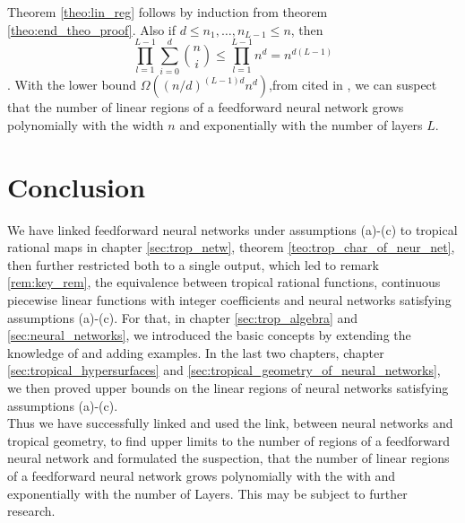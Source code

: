 \documentclass{article}
\theoremstyle{definition}
\begin{document}
Theorem \ref{theo:lin_reg} follows by induction from theorem \ref{theo:end_theo_proof}. Also if $d \leq n_1, \dots , n_{L-1} \leq n$, then
$$\displaystyle\prod_{l=1}^{L-1}\displaystyle\sum_{i=0}^{d}\binom{n}{i} \leq \displaystyle\prod_{l=1}^{L-1} n^{d} = n^{d(L-1)}$$. With the lower bound $\Omega((n/d)^{(L-1)d}n^{d})$,from \cite[corollary 5]{montufar2014number} cited in \cite{maclagan2015introduction}, we can suspect that the number of linear regions of a feedforward neural network grows polynomially with the width $n$ and exponentially with the number of layers $L$.

\newpage

\section{Conclusion}
\label{sec:conclusion}

We have linked feedforward neural networks under assumptions (a)-(c) to tropical rational maps in chapter \ref{sec:trop_netw}, theorem \ref{teo:trop_char_of_neur_net}, then further restricted both to a single output, which led to remark \ref{rem:key_rem}, the equivalence between tropical rational functions, continuous piecewise linear functions with integer coefficients and neural networks satisfying assumptions (a)-(c). For that, in chapter \ref{sec:trop_algebra} and \ref{sec:neural_networks}, we introduced the basic concepts by extending the knowledge of \cite{maclagan2015introduction} and adding examples. In the last two chapters, chapter \ref{sec:tropical_hypersurfaces} and \ref{sec:tropical_geometry_of_neural_networks}, we then proved  upper bounds on the linear regions of neural networks satisfying assumptions (a)-(c). \\
Thus we have successfully linked and used the link, between neural networks and tropical geometry, to find upper limits to the number of regions of a feedforward neural network and formulated the suspection, that the number of linear regions of a feedforward neural network grows polynomially with the with and exponentially with the number of Layers. This may be subject to further research. 

\newpage
\end{document}

